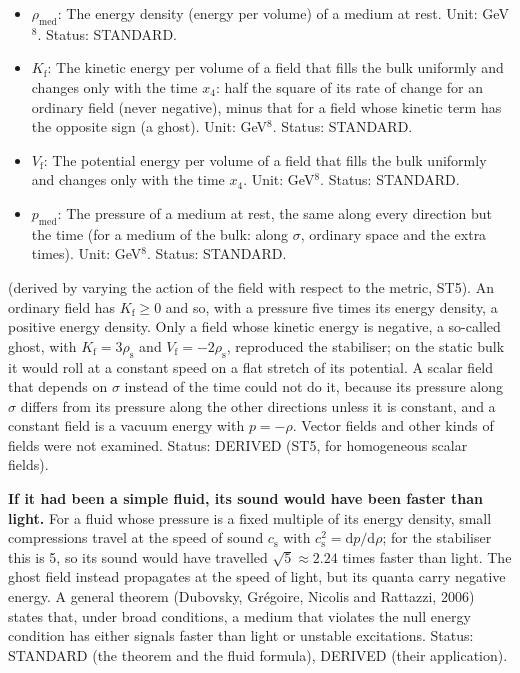 \documentclass[
  10pt,
]{article}
\providecommand{\tightlist}{%
  \setlength{\itemsep}{0pt}\setlength{\parskip}{0pt}}
\begin{document}
\begin{itemize}
\tightlist
\item
  \(\rho_{\mathrm{med}}\): The energy density (energy per volume) of a
  medium at rest. Unit: GeV\(^8\). Status: STANDARD.
\item
  \(K_{\mathrm{f}}\): The kinetic energy per volume of a field that
  fills the bulk uniformly and changes only with the time \(x_4\): half
  the square of its rate of change for an ordinary field (never
  negative), minus that for a field whose kinetic term has the opposite
  sign (a ghost). Unit: GeV\(^8\). Status: STANDARD.
\item
  \(V_{\mathrm{f}}\): The potential energy per volume of a field that
  fills the bulk uniformly and changes only with the time \(x_4\). Unit:
  GeV\(^8\). Status: STANDARD.
\item
  \(p_{\mathrm{med}}\): The pressure of a medium at rest, the same along
  every direction but the time (for a medium of the bulk: along
  \(\sigma\), ordinary space and the extra times). Unit: GeV\(^8\).
  Status: STANDARD.
\end{itemize}

(derived by varying the action of the field with respect to the metric,
ST5). An ordinary field has \(K_{\mathrm{f}} \ge 0\) and so, with a
pressure five times its energy density, a positive energy density. Only
a field whose kinetic energy is negative, a so-called ghost, with
\(K_{\mathrm{f}} = 3\rho_{\mathrm{s}}\) and
\(V_{\mathrm{f}} = -2\rho_{\mathrm{s}}\), reproduced the stabiliser; on
the static bulk it would roll at a constant speed on a flat stretch of
its potential. A scalar field that depends on \(\sigma\) instead of the
time could not do it, because its pressure along \(\sigma\) differs from
its pressure along the other directions unless it is constant, and a
constant field is a vacuum energy with \(p = -\rho\). Vector fields and
other kinds of fields were not examined. Status: DERIVED (ST5, for
homogeneous scalar fields).

\textbf{If it had been a simple fluid, its sound would have been faster
than light.} For a fluid whose pressure is a fixed multiple of its
energy density, small compressions travel at the speed of sound
\(c_{\mathrm{s}}\) with
\(c_{\mathrm{s}}^2 = \mathrm{d}p/\mathrm{d}\rho\); for the stabiliser
this is 5, so its sound would have travelled \(\sqrt5 \approx 2.24\)
times faster than light. The ghost field instead propagates at the speed
of light, but its quanta carry negative energy. A general theorem
(Dubovsky, Grégoire, Nicolis and Rattazzi, 2006) states that, under
broad conditions, a medium that violates the null energy condition has
either signals faster than light or unstable excitations. Status:
STANDARD (the theorem and the fluid formula), DERIVED (their
application).
\end{document}
